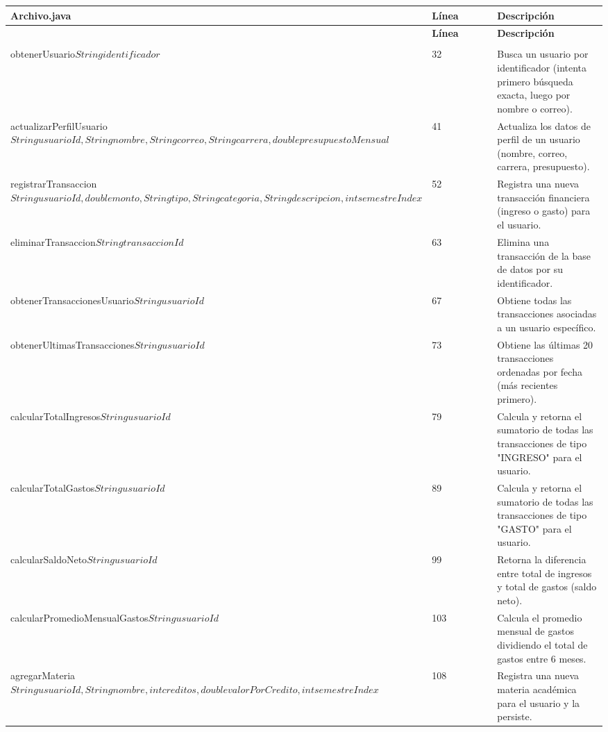 \documentclass[utf8]{article}
\begin{document}
\begin{longtable}{p{0.18\linewidth}p{0.32\linewidth}p{0.5\linewidth}}
\hline
\textbf{Archivo.java} & \textbf{Línea} & \textbf{Descripción} \\ \hline
\endfirsthead}
\hline
\textbf{Archivo.java} & \textbf{Línea} & \textbf{Descripción} \\ \hline
\endhead}
\hline
\endfoot}
\textbf{FinanzasController.java} & & \\ \hline
obtenerUsuario\(String identificador\) & 32 & Busca un usuario por identificador (intenta primero búsqueda exacta, luego por nombre o correo). \\
actualizarPerfilUsuario\(String usuarioId, String nombre, String correo, String carrera, double presupuestoMensual\) & 41 & Actualiza los datos de perfil de un usuario (nombre, correo, carrera, presupuesto). \\
registrarTransaccion\(String usuarioId, double monto, String tipo, String categoria, String descripcion, int semestreIndex\) & 52 & Registra una nueva transacción financiera (ingreso o gasto) para el usuario. \\
eliminarTransaccion\(String transaccionId\) & 63 & Elimina una transacción de la base de datos por su identificador. \\
obtenerTransaccionesUsuario\(String usuarioId\) & 67 & Obtiene todas las transacciones asociadas a un usuario específico. \\
obtenerUltimasTransacciones\(String usuarioId\) & 73 & Obtiene las últimas 20 transacciones ordenadas por fecha (más recientes primero). \\
calcularTotalIngresos\(String usuarioId\) & 79 & Calcula y retorna el sumatorio de todas las transacciones de tipo "INGRESO" para el usuario. \\
calcularTotalGastos\(String usuarioId\) & 89 & Calcula y retorna el sumatorio de todas las transacciones de tipo "GASTO" para el usuario. \\
calcularSaldoNeto\(String usuarioId\) & 99 & Retorna la diferencia entre total de ingresos y total de gastos (saldo neto). \\
calcularPromedioMensualGastos\(String usuarioId\) & 103 & Calcula el promedio mensual de gastos dividiendo el total de gastos entre 6 meses. \\
agregarMateria\(String usuarioId, String nombre, int creditos, double valorPorCredito, int semestreIndex\) & 108 & Registra una nueva materia académica para el usuario y la persiste. \\

\end{longtable}
\end{document}
